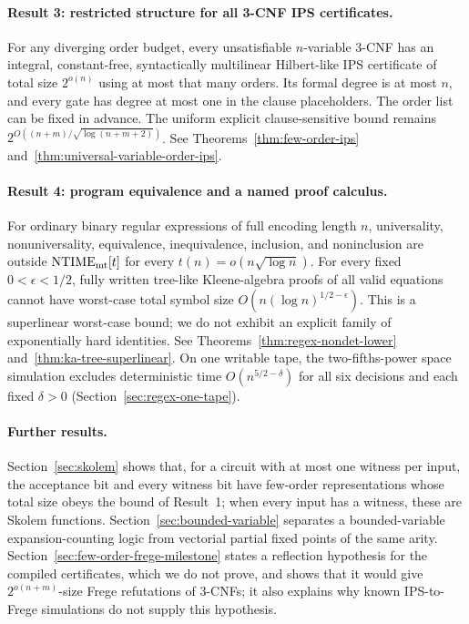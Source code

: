 \documentclass[11pt]{article}
\theoremstyle{definition}
\theoremstyle{remark}
\begin{document}
\paragraph{Result 3: restricted structure for all 3-CNF IPS certificates.}
For any diverging order budget, every unsatisfiable $n$-variable 3-CNF
has an integral, constant-free, syntactically multilinear Hilbert-like
IPS certificate of total size $2^{o(n)}$ using at most that many
orders. Its formal degree is at most $n$, and every gate has degree
at most one in the clause placeholders. The order list can be fixed
in advance. The uniform explicit clause-sensitive bound remains
$2^{O((n+m)/\sqrt{\log(n+m+2)})}$. See
Theorems~\ref{thm:few-order-ips} and~\ref{thm:universal-variable-order-ips}.

\paragraph{Result 4: program equivalence and a named proof calculus.}
For ordinary binary regular expressions of full encoding length $n$,
universality, nonuniversality, equivalence, inequivalence, inclusion,
and noninclusion are outside $\mathrm{NTIME}_{\rm mt}[t]$ for every
$t(n)=o(n\sqrt{\log n})$. For every fixed $0<\epsilon<1/2$, fully
written tree-like Kleene-algebra proofs of all valid equations cannot
have worst-case total symbol size
$O(n(\log n)^{1/2-\epsilon})$. This is a superlinear worst-case
bound; we do not exhibit an explicit family of exponentially hard
identities. See Theorems~\ref{thm:regex-nondet-lower}
and~\ref{thm:ka-tree-superlinear}. On one writable tape, the
two-fifths-power space simulation excludes deterministic time
$O(n^{5/2-\delta})$ for all six decisions and each fixed $\delta>0$
(Section~\ref{sec:regex-one-tape}).

\paragraph{Further results.}
Section~\ref{sec:skolem} shows that, for a circuit with at most one
witness per input, the acceptance bit and every witness bit have
few-order representations whose total size obeys the bound of Result~1;
when every input has a witness, these are Skolem functions.
Section~\ref{sec:bounded-variable} separates a bounded-variable
expansion-counting logic from vectorial partial fixed points of the
same arity. Section~\ref{sec:few-order-frege-milestone} states a
reflection hypothesis for the compiled certificates, which we do not
prove, and shows that it would give $2^{o(n+m)}$-size Frege
refutations of 3-CNFs; it also explains why known IPS-to-Frege
simulations do not supply this hypothesis.
\end{document}
